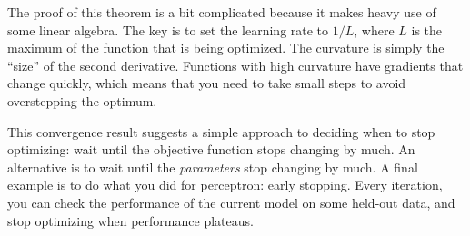 
The proof of this theorem is a bit complicated because it makes heavy
use of some linear algebra.  The key is to set the learning rate to
$1/L$, where $L$ is the maximum  of the function
that is being optimized.  The curvature is simply the ``size'' of the
second derivative.  Functions with high curvature have gradients that
change quickly, which means that you need to take small steps to avoid
overstepping the optimum.

\begin{comment}
Fortunately, we can prove a simpler version of this theorem for
one-dimensional functions.  We do this just to give a sense of how
convergence proofs go.  In the single dimensional case, we will call
the algorithm ``derivative descent.''  To set up some notation, let
$f(z)$ be the function to be minimized by derivative descent.  Let
$z_0$ be the initial value and $z^*$ be the optimum.  Let $f'(z)$ be
the first derivative of $f$ and let $f''$ be the second derivative.
Let $L$ be large enough that $f''(z) < L$ for all $z$.

\begin{theorem}[Derivative Descent Convergence] \label{thm:loss:dd}
  For constant $\eta = 1/L$, derivative descent will converge at a
  rate of $f(z\kth) - f(z^*) \leq \frac {2 (z\zth-z^*)^2} {\eta(k+1)}$.
\end{theorem}

\begin{myproof}{\ref{thm:loss:dd}}
  We use Taylor's theorem to expand $f(z)$:
  \begin{align}
    f(z)
      &= f(a)
       + f'(a) (z-a)
       + \frac 1 2 f''(a) (z-a)^2
       + \dots \\
      &\leq f(a)
       + f'(a) (z-a)
       + \frac 1 2 f''(a) (z-a)^2
  \end{align}
  The ``\dots'' is guaranteed to be non-negative because $f$ is
  convex.  
\end{myproof}
\end{comment}

This convergence result suggests a simple approach to deciding when to
stop optimizing: wait until the objective function stops changing by
much.  An alternative is to wait until the \emph{parameters} stop
changing by much.  A final example is to do what you did for
perceptron: early stopping.  Every iteration, you can check the
performance of the current model on some held-out data, and stop
optimizing when performance plateaus.

